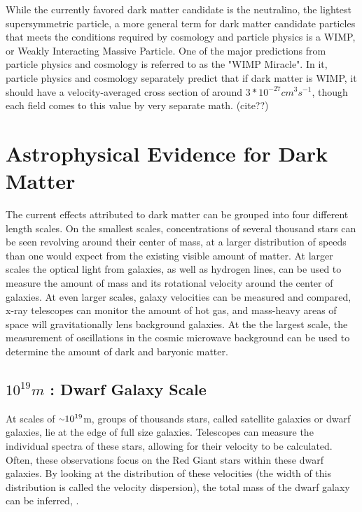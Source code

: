   While the currently favored dark matter candidate is the neutralino, the lightest supersymmetric particle, a more general term for dark matter candidate particles that meets the conditions required by cosmology and particle physics is a WIMP, or Weakly Interacting Massive Particle.
  One of the major predictions from particle physics and cosmology is referred to as the "WIMP Miracle".
  In it, particle physics and cosmology separately predict that if dark matter is WIMP, it should have a velocity-averaged cross section of around $3*10^{-27}cm^{3}s^{-1}$, though each field comes to this value by very separate math. {\color{red}(cite??)}

\section{Astrophysical Evidence for Dark Matter}
  The current effects attributed to dark matter can be grouped into four different length scales.
  On the smallest scales, concentrations of several thousand stars can be seen revolving around their center of mass, at a larger distribution of speeds than one would expect from the existing visible amount of matter.
  At larger scales the optical light from galaxies, as well as hydrogen lines, can be used to measure the amount of mass and its rotational velocity around the center of galaxies.
  At even larger scales, galaxy velocities can be measured and compared, x-ray telescopes can monitor the amount of hot gas, and mass-heavy areas of space will gravitationally lens background galaxies.
  At the the largest scale, the measurement of oscillations in the cosmic microwave background can be used to determine the amount of dark and baryonic matter.
  
  \subsection{$10^{19}m$ : Dwarf Galaxy Scale}
    At scales of $\nicetilde 10^{19}$m, groups of thousands stars, called satellite galaxies or dwarf galaxies, lie at the edge of full size galaxies.
    Telescopes can measure the individual spectra of these stars, allowing for their velocity to be calculated.
    Often, these observations focus on the Red Giant stars within these dwarf galaxies\cite{dwarf_gal_red_giant}.
    By looking at the distribution of these velocities (the width of this distribution is called the velocity dispersion), the total mass of the dwarf galaxy can be inferred\cite{dwarf_gal_vel_dispersion}, \cite{dwarf_gal_vel_dispersion2}.

